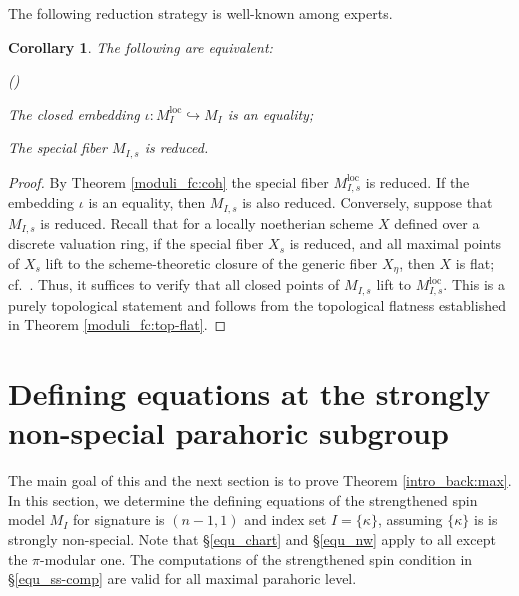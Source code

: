 \documentclass[pdflatex,sn-mathphys-num]{sn-jnl}%
\theoremstyle{thmstyleone}%
\newtheorem{corollary}[subsubsection]{Corollary}%
\theoremstyle{thmstyletwo}%
\numberwithin{equation}{subsection}
\theoremstyle{thmstylethree}%
\newcommand{\loc}{\ensuremath{\mathrm{loc}}\xspace}
\newenvironment{altenumerate}
	{\begin{list}
			{(\theenumi) }
			{\usecounter{enumi}
				\setlength{\labelwidth}{0pt}
				\setlength{\labelsep}{0pt}
				\setlength{\leftmargin}{0pt}
				\setlength{\itemsep}{\the\smallskipamount}
				\renewcommand{\theenumi}{\roman{enumi}}
		}}
		{\end{list}}
\begin{document}
The following reduction strategy is well-known among experts.
\begin{corollary}\label{moduli_fc:reduced}
The following are equivalent:
\begin{altenumerate}
\item The closed embedding $\iota:M_I^\loc\hookrightarrow M_I$ is an equality;
\item The special fiber $M_{I,s}$ is reduced.
\end{altenumerate}
\end{corollary}
\begin{proof}
By Theorem \ref{moduli_fc:coh} the special fiber $M^\loc_{I,s}$ is reduced.
If the embedding $\iota$ is an equality, then $M_{I,s}$ is also reduced.
Conversely, suppose that $M_{I,s}$ is reduced. 
Recall that for a locally noetherian scheme $X$ defined over a discrete valuation ring, if the special fiber $X_s$ is reduced, and all maximal points of $X_s$ lift to the scheme-theoretic closure of the generic fiber $X_\eta$, then $X$ is flat; cf.\ \cite[Proposition 14.17]{GW2020}.
Thus, it suffices to verify that all closed points of $M_{I,s}$ lift to $M_{I,s}^\loc$. This is a purely topological statement and follows from the topological flatness established in Theorem \ref{moduli_fc:top-flat}.
\end{proof} 
		
\section{Defining equations at the strongly non-special parahoric subgroup}\label{equ}
The main goal of this and the next section is to prove Theorem \ref{intro_back:max}. 
In this section, we determine the defining equations of the strengthened spin model $M_I$ for signature is $(n-1,1)$ and index set $I=\{\kappa\}$, assuming $\{\kappa\}$ is is strongly non-special.
Note that \S \ref{equ_chart} and \S \ref{equ_nw} apply to all except the $\pi$-modular one. The computations of the strengthened spin condition in \S \ref{equ_ss-comp} are valid for all maximal parahoric level.
		
\end{document}
